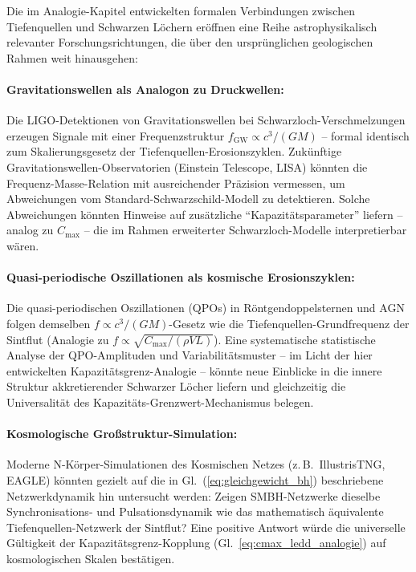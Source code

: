 ﻿\documentclass[12pt,a4paper]{report}
\begin{document}
Die im Analogie-Kapitel entwickelten formalen Verbindungen zwischen Tiefenquellen und Schwarzen Löchern eröffnen eine Reihe astrophysikalisch relevanter Forschungsrichtungen, die über den ursprünglichen geologischen Rahmen weit hinausgehen:

\paragraph{Gravitationswellen als Analogon zu Druckwellen:}
Die LIGO-Detektionen von Gravitationswellen bei Schwarzloch-Verschmelzungen \cite{abbott2016ligo} erzeugen Signale mit einer Frequenzstruktur $f_{\mathrm{GW}} \propto c^3/(GM)$ -- formal identisch zum Skalierungsgesetz der Tiefenquellen-Erosionszyklen. Zukünftige Gravitationswellen-Observatorien (Einstein Telescope, LISA) könnten die Frequenz-Masse-Relation mit ausreichender Präzision vermessen, um Abweichungen vom Standard-Schwarzschild-Modell zu detektieren. Solche Abweichungen könnten Hinweise auf zusätzliche ``Kapazitätsparameter'' liefern -- analog zu $C_{\max}$ -- die im Rahmen erweiterter Schwarzloch-Modelle interpretierbar wären.

\paragraph{Quasi-periodische Oszillationen als kosmische Erosionszyklen:}
Die quasi-perio\-dischen Oszillationen (QPOs) in Röntgendoppelsternen \cite{strohmayer2001} und AGN folgen demselben $f \propto c^3/(GM)$-Gesetz wie die Tiefenquellen-Grundfrequenz der Sintflut (Analogie zu $f \propto \sqrt{C_{\max}/(\rho V L)}$). Eine systematische statistische Analyse der QPO-Amplituden und Variabilitätsmuster -- im Licht der hier entwickelten Kapazitätsgrenz-Analogie -- könnte neue Einblicke in die innere Struktur akkretierender Schwarzer Löcher liefern und gleichzeitig die Universalität des Kapazitäts-Grenzwert-Mechanismus belegen.

\paragraph{Kosmologische Großstruktur-Simulation:}
Moderne N-Körper-Simulationen des Kosmischen Netzes (z.\,B.\ IllustrisTNG, EAGLE) könnten gezielt auf die in Gl.~(\ref{eq:gleichgewicht_bh}) beschriebene Netzwerkdynamik hin untersucht werden: Zeigen SMBH-Netzwerke dieselbe Synchronisations- und Pulsationsdynamik wie das mathematisch äquivalente Tiefenquellen-Netzwerk der Sintflut? Eine positive Antwort würde die universelle Gültigkeit der Kapazitätsgrenz-Kopplung (Gl.~\ref{eq:cmax_ledd_analogie}) auf kosmologischen Skalen bestätigen.
\end{document}
